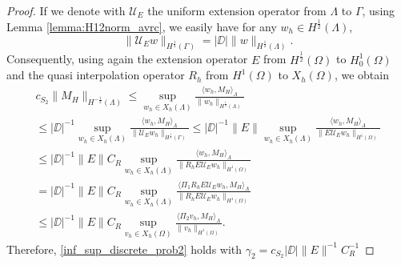 \begin{proof}
If we denote with $\mathcal{U}_E$ the uniform extension operator from $\Lambda$ to $\Gamma$, using Lemma \ref{lemma:H12norm_avrc}, we easily have for any $w_h \in H^{\frac 12}(\Lambda)$,
\begin{equation*}
\|\mathcal{U}_E w\|_{H^{\frac 12}(\Gamma)}=|\DD| \|w\|_{H^{\frac 12}(\Lambda)}.
\end{equation*}
Consequently, using again the extension operator $E$ from $H^{\frac 12}(\Omega)$ to $H^1_0(\Omega)$ and the quasi interpolation operator $R_h$ from $H^1(\Omega)$ to $X_h(\Omega)$, we obtain
\begin{multline}
c_{S_2} \|M_H\|_{H^{-\frac 12}(\Lambda)} \leq 
\sup_{w_h \in X_h(\Lambda)} \frac{ \langle w_h, M_H \rangle_{\Lambda} } {\|w_h\|_{H^{\frac 12}(\Lambda)}} 
\\
\leq |\DD|^{-1} \sup_{w_h \in X_h(\Lambda)} \frac{ \langle w_h, M_H \rangle _{\Lambda}} {\|\mathcal{U}_E w_h\|_{H^{\frac 12}(\Gamma)}} 
\leq |\DD|^{-1}\|E\| \sup_{w_h \in X_h(\Lambda)} \frac{ \langle w_h, M_H \rangle _{\Lambda} } {\|E \mathcal{U}_E w_h\|_{H^1(\Omega)}} 
\\
\leq |\DD|^{-1}\|E\| C_R \sup_{w_h \in X_h(\Lambda)} \frac{ \langle w_h, M_H \rangle _{\Lambda} } {\|R_h E \mathcal{U}_E w_h\|_{H^1(\Omega)}}
\\ 
=  |\DD|^{-1}\|E\| C_R \sup_{w_h \in X_h(\Lambda)} \frac{ \langle \Pi _1  R_h E \mathcal{U}_E w_h, M_H \rangle _{\Lambda}} {\|R_h E \mathcal{U}_E w_h\|_{H^1(\Omega)}}
\\
\leq |\DD|^{-1}\|E\| C_R \sup_{v_h \in X_h(\Omega)} \frac{ \langle \Pi _2  v_h, M_H \rangle _{\Lambda}} {\|v_h\|_{H^1(\Omega)}}. 
\end{multline}
Therefore, \eqref{inf_sup_discrete_prob2} holds with $\gamma_2=  c_{S_2} |\DD| \|E\|^{-1} C_R^{-1}$
\end{proof}

